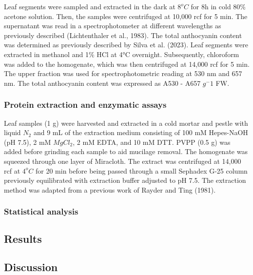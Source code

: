 \documentclass[
  12pt,
  letterpaper,
  DIV=11,
  numbers=noendperiod]{scrartcl}
\begin{document}
Leaf segments were sampled and extracted in the dark at \(8^oC\) for 8h
in cold 80\% acetone solution. Then, the samples were centrifuged at
10,000 rcf for 5 min. The supernatant was read in a spectrophotometer at
different wavelengths as previously described (Lichtenthaler et al.,
1983). The total anthocyanin content was determined as previously
described by Silva et al. (2023). Leaf segments were extracted in
methanol and 1\% HCl at 4°C overnight. Subsequently, chloroform was
added to the homogenate, which was then centrifuged at 14,000 rcf for 5
min. The upper fraction was used for spectrophotometric reading at 530
nm and 657 nm. The total anthocyanin content was expressed as A530 -
A657 \(g^-1\) FW.

\hypertarget{protein-extraction-and-enzymatic-assays}{%
\subsubsection{Protein extraction and enzymatic
assays}\label{protein-extraction-and-enzymatic-assays}}

Leaf samples (1 g) were harvested and extracted in a cold mortar and
pestle with liquid \(N_2\) and 9 mL of the extraction medium consisting
of 100 mM Hepes-NaOH (pH 7.5), 2 mM \(MgCl_2\), 2 mM EDTA, and 10 mM
DTT. PVPP (0.5 g) was added before grinding each sample to aid mucilage
removal. The homogenate was squeezed through one layer of Miracloth. The
extract was centrifuged at 14,000 rcf at \(4^oC\) for 20 min before
being passed through a small Sephadex G-25 column previously
equilibrated with extraction buffer adjusted to pH 7.5. The extraction
method was adapted from a previous work of Rayder and Ting (1981).

\hypertarget{statistical-analysis}{%
\subsubsection{Statistical analysis}\label{statistical-analysis}}

\hypertarget{results}{%
\subsection{Results}\label{results}}

\hypertarget{discussion}{%
\subsection{Discussion}\label{discussion}}
\end{document}
